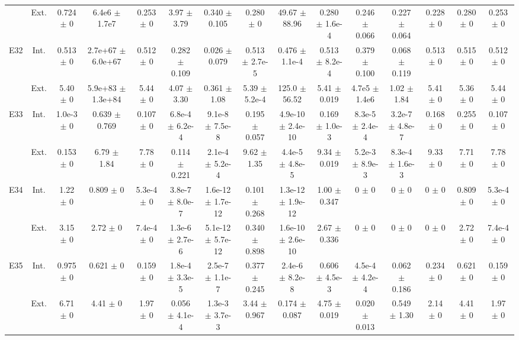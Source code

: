 \begin{table}[htbp]
{\begin{tabular}{@{}ccccccccccccccc@{}}
 & Ext. & 0.724 $\pm$ 0 & 6.4e6 $\pm$ 1.7e7 & 0.253 $\pm$ 0 & 3.97 $\pm$ 3.79 & 0.340 $\pm$ 0.105 & 0.280 $\pm$ 0 & 49.67 $\pm$ 88.96 & 0.280 $\pm$ 1.6e-4 & 0.246 $\pm$ 0.066 & 0.227 $\pm$ 0.064 & 0.228 $\pm$ 0 & 0.280 $\pm$ 0 & 0.253 $\pm$ 0 \\
\cline{2-15}
\multirow{2}{*}{E32} & Int. & 0.513 $\pm$ 0 & 2.7e+67 $\pm$ 6.0e+67 & 0.512 $\pm$ 0 & 0.282 $\pm$ 0.109 & 0.026 $\pm$ 0.079 & 0.513 $\pm$ 2.7e-5 & 0.476 $\pm$ 1.1e-4 & 0.513 $\pm$ 8.2e-4 & 0.379 $\pm$ 0.100 & 0.068 $\pm$ 0.119 & 0.513 $\pm$ 0 & 0.515 $\pm$ 0 & 0.512 $\pm$ 0 \\
 & Ext. & 5.40 $\pm$ 0 & 5.9e+83 $\pm$ 1.3e+84 & 5.44 $\pm$ 0 & 4.07 $\pm$ 3.30 & 0.361 $\pm$ 1.08 & 5.39 $\pm$ 5.2e-4 & 125.0 $\pm$ 56.52 & 5.41 $\pm$ 0.019 & 4.7e5 $\pm$ 1.4e6 & 1.02 $\pm$ 1.84 & 5.41 $\pm$ 0 & 5.36 $\pm$ 0 & 5.44 $\pm$ 0 \\
\cline{2-15}
\multirow{2}{*}{E33} & Int. & 1.0e-3 $\pm$ 0 & 0.639 $\pm$ 0.769 & 0.107 $\pm$ 0 & 6.8e-4 $\pm$ 6.2e-4 & 9.1e-8 $\pm$ 7.5e-8 & 0.195 $\pm$ 0.057 & 4.9e-10 $\pm$ 2.4e-10 & 0.169 $\pm$ 1.0e-3 & 8.3e-5 $\pm$ 2.4e-4 & 3.2e-7 $\pm$ 4.8e-7 & 0.168 $\pm$ 0 & 0.255 $\pm$ 0 & 0.107 $\pm$ 0 \\
 & Ext. & 0.153 $\pm$ 0 & 6.79 $\pm$ 1.84 & 7.78 $\pm$ 0 & 0.114 $\pm$ 0.221 & 2.1e-4 $\pm$ 5.2e-4 & 9.62 $\pm$ 1.35 & 4.4e-5 $\pm$ 4.8e-5 & 9.34 $\pm$ 0.019 & 5.2e-3 $\pm$ 8.9e-3 & 8.3e-4 $\pm$ 1.6e-3 & 9.33 $\pm$ 0 & 7.71 $\pm$ 0 & 7.78 $\pm$ 0 \\
\cline{2-15}
\multirow{2}{*}{E34} & Int. & 1.22 $\pm$ 0 & 0.809 $\pm$ 0 & 5.3e-4 $\pm$ 0 & 3.8e-7 $\pm$ 8.0e-7 & 1.6e-12 $\pm$ 1.7e-12 & 0.101 $\pm$ 0.268 & 1.3e-12 $\pm$ 1.9e-12 & 1.00 $\pm$ 0.347 & 0 $\pm$ 0 & 0 $\pm$ 0 & 0 $\pm$ 0 & 0.809 $\pm$ 0 & 5.3e-4 $\pm$ 0 \\
 & Ext. & 3.15 $\pm$ 0 & 2.72 $\pm$ 0 & 7.4e-4 $\pm$ 0 & 1.3e-6 $\pm$ 2.7e-6 & 5.1e-12 $\pm$ 5.7e-12 & 0.340 $\pm$ 0.898 & 1.6e-10 $\pm$ 2.6e-10 & 2.67 $\pm$ 0.336 & 0 $\pm$ 0 & 0 $\pm$ 0 & 0 $\pm$ 0 & 2.72 $\pm$ 0 & 7.4e-4 $\pm$ 0 \\
\cline{2-15}
\multirow{2}{*}{E35} & Int. & 0.975 $\pm$ 0 & 0.621 $\pm$ 0 & 0.159 $\pm$ 0 & 1.8e-4 $\pm$ 3.3e-5 & 2.5e-7 $\pm$ 1.1e-7 & 0.377 $\pm$ 0.245 & 2.4e-6 $\pm$ 8.2e-8 & 0.606 $\pm$ 4.5e-3 & 4.5e-4 $\pm$ 4.2e-4 & 0.062 $\pm$ 0.186 & 0.234 $\pm$ 0 & 0.621 $\pm$ 0 & 0.159 $\pm$ 0 \\
 & Ext. & 6.71 $\pm$ 0 & 4.41 $\pm$ 0 & 1.97 $\pm$ 0 & 0.056 $\pm$ 4.1e-4 & 1.3e-3 $\pm$ 3.7e-3 & 3.44 $\pm$ 0.967 & 0.174 $\pm$ 0.087 & 4.75 $\pm$ 0.019 & 0.020 $\pm$ 0.013 & 0.549 $\pm$ 1.30 & 2.14 $\pm$ 0 & 4.41 $\pm$ 0 & 1.97 $\pm$ 0 \\

\end{tabular}}
\end{table}
